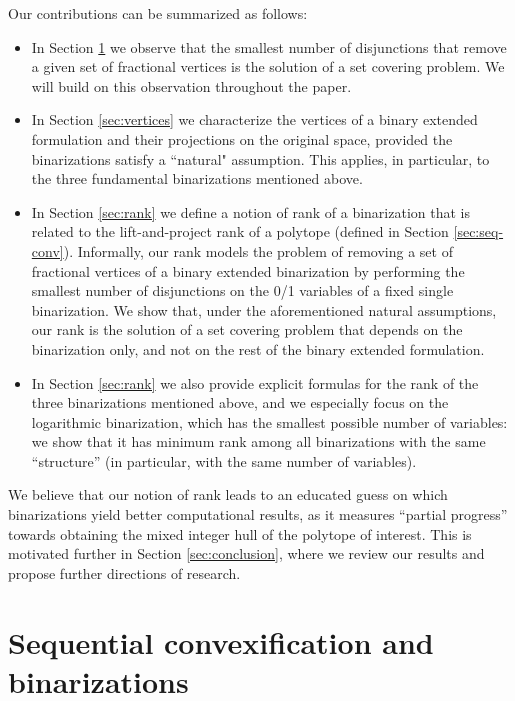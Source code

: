 \documentclass[11pt,a4paper]{article}
\newcommand{\1}{\textbf{1}}
\begin{document}
Our contributions can be summarized as follows:
\begin{itemize}
    \item In Section \ref{sec:seqcon-bin} we observe that the smallest number of disjunctions that remove a given set of fractional vertices is the solution of a set covering problem. We will build on this observation throughout the paper.
    \item In Section \ref{sec:vertices} we characterize the vertices of a binary extended formulation and their projections on the original space, provided the binarizations satisfy a ``natural" assumption. This applies, in particular, to the three fundamental  binarizations mentioned above.
    \item In Section \ref{sec:rank} we define a notion of rank of a binarization that is related to the lift-and-project rank of a polytope (defined in Section \ref{sec:seq-conv}). Informally, our rank models the problem of 
removing a set of fractional vertices of a binary extended binarization by performing the smallest number of disjunctions on the 0/1 variables of a fixed single binarization. We show that, under the aforementioned natural assumptions, our rank is the solution of a set covering problem that depends on the binarization only, and not on the rest of the binary extended formulation.
\item In Section \ref{sec:rank} we also provide explicit formulas for the rank of the three  binarizations mentioned above, and we especially focus on the logarithmic binarization, which has the smallest possible number of variables: we show that it has minimum rank among all binarizations with the same ``structure'' (in particular, with the same number of variables).
\end{itemize}
 
 We believe that our notion of rank leads to an educated guess on which binarizations yield better computational results, as it measures ``partial progress'' towards obtaining the mixed integer hull of the polytope of interest. This is motivated further in Section \ref{sec:conclusion}, where we review our results and propose further directions of research.




\section{Sequential convexification and binarizations}\label{sec:seqcon-bin}
\end{document}
